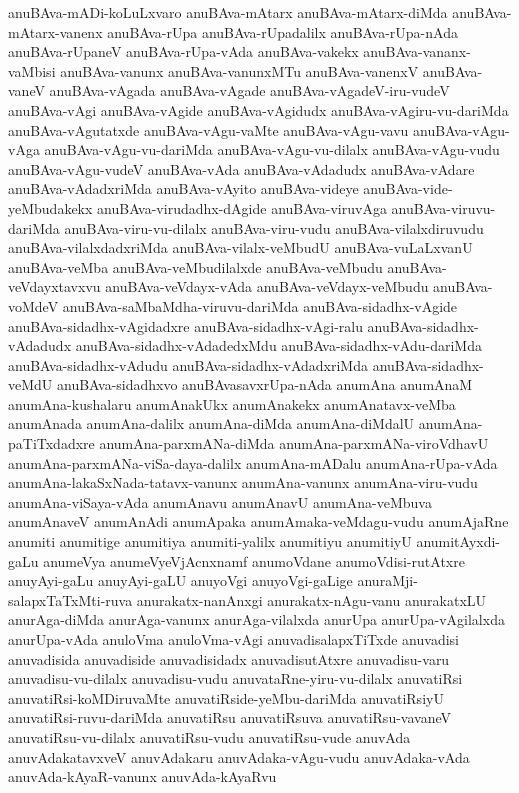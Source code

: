 {anuBAva-mADi-koLuLxvaro
anuBAva-mAtarx
anuBAva-mAtarx-diMda
anuBAva-mAtarx-vanenx
anuBAva-rUpa
anuBAva-rUpadalilx
anuBAva-rUpa-nAda
anuBAva-rUpaneV
anuBAva-rUpa-vAda
anuBAva-vakekx
anuBAva-vananx-vaMbisi
anuBAva-vanunx
anuBAva-vanunxMTu
anuBAva-vanenxV
anuBAva-vaneV
anuBAva-vAgada
anuBAva-vAgade
anuBAva-vAgadeV-iru-vudeV
anuBAva-vAgi
anuBAva-vAgide
anuBAva-vAgidudx
anuBAva-vAgiru-vu-dariMda
anuBAva-vAgutatxde
anuBAva-vAgu-vaMte
anuBAva-vAgu-vavu
anuBAva-vAgu-vAga
anuBAva-vAgu-vu-dariMda
anuBAva-vAgu-vu-dilalx
anuBAva-vAgu-vudu
anuBAva-vAgu-vudeV
anuBAva-vAda
anuBAva-vAdadudx
anuBAva-vAdare
anuBAva-vAdadxriMda
anuBAva-vAyito
anuBAva-videye
anuBAva-vide-yeMbudakekx
anuBAva-virudadhx-dAgide
anuBAva-viruvAga
anuBAva-viruvu-dariMda
anuBAva-viru-vu-dilalx
anuBAva-viru-vudu
anuBAva-vilalxdiruvudu
anuBAva-vilalxdadxriMda
anuBAva-vilalx-veMbudU
anuBAva-vuLaLxvanU
anuBAva-veMba
anuBAva-veMbudilalxde
anuBAva-veMbudu
anuBAva-veVdayxtavxvu
anuBAva-veVdayx-vAda
anuBAva-veVdayx-veMbudu
anuBAva-voMdeV
anuBAva-saMbaMdha-viruvu-dariMda
anuBAva-sidadhx-vAgide
anuBAva-sidadhx-vAgidadxre
anuBAva-sidadhx-vAgi-ralu
anuBAva-sidadhx-vAdadudx
anuBAva-sidadhx-vAdadedxMdu
anuBAva-sidadhx-vAdu-dariMda
anuBAva-sidadhx-vAdudu
anuBAva-sidadhx-vAdadxriMda
anuBAva-sidadhx-veMdU
anuBAva-sidadhxvo
anuBAvasavxrUpa-nAda
anumAna
anumAnaM
anumAna-kushalaru
anumAnakUkx
anumAnakekx
anumAnatavx-veMba
anumAnada
anumAna-dalilx
anumAna-diMda
anumAna-diMdalU
anumAna-paTiTxdadxre
anumAna-parxmANa-diMda
anumAna-parxmANa-viroVdhavU
anumAna-parxmANa-viSa-daya-dalilx
anumAna-mADalu
anumAna-rUpa-vAda
anumAna-lakaSxNada-tatavx-vanunx
anumAna-vanunx
anumAna-viru-vudu
anumAna-viSaya-vAda
anumAnavu
anumAnavU
anumAna-veMbuva
anumAnaveV
anumAnAdi
anumApaka
anumAmaka-veMdagu-vudu
anumAjaRne
anumiti
anumitige
anumitiya
anumiti-yalilx
anumitiyu
anumitiyU
anumitAyxdi-gaLu
anumeVya
anumeVyeVjAcnxnamf
anumoVdane
anumoVdisi-rutAtxre
anuyAyi-gaLu
anuyAyi-gaLU
anuyoVgi
anuyoVgi-gaLige
anuraMji-salapxTaTxMti-ruva
anurakatx-nanAnxgi
anurakatx-nAgu-vanu
anurakatxLU
anurAga-diMda
anurAga-vanunx
anurAga-vilalxda
anurUpa
anurUpa-vAgilalxda
anurUpa-vAda
anuloVma
anuloVma-vAgi
anuvadisalapxTiTxde
anuvadisi
anuvadisida
anuvadiside
anuvadisidadx
anuvadisutAtxre
anuvadisu-varu
anuvadisu-vu-dilalx
anuvadisu-vudu
anuvataRne-yiru-vu-dilalx
anuvatiRsi
anuvatiRsi-koMDiruvaMte
anuvatiRside-yeMbu-dariMda
anuvatiRsiyU
anuvatiRsi-ruvu-dariMda
anuvatiRsu
anuvatiRsuva
anuvatiRsu-vavaneV
anuvatiRsu-vu-dilalx
anuvatiRsu-vudu
anuvatiRsu-vude
anuvAda
anuvAdakatavxveV
anuvAdakaru
anuvAdaka-vAgu-vudu
anuvAdaka-vAda
anuvAda-kAyaR-vanunx
anuvAda-kAyaRvu
}
